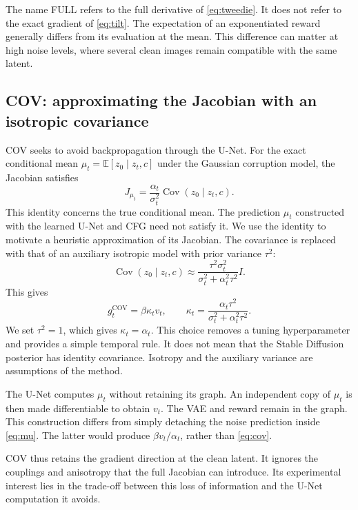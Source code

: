 \documentclass[11pt,a4paper]{article}
\newcommand{\E}{\mathbb{E}}
\newcommand{\Cov}{\operatorname{Cov}}
\begin{document}
The name FULL refers to the full derivative of \eqref{eq:tweedie}. It does not refer to the exact gradient of \eqref{eq:tilt}. The expectation of an exponentiated reward generally differs from its evaluation at the mean. This difference can matter at high noise levels, where several clean images remain compatible with the same latent.

\subsection{COV: approximating the Jacobian with an isotropic covariance}
COV seeks to avoid backpropagation through the U-Net. For the exact conditional mean $\mu_t=\E[z_0\mid z_t,c]$ under the Gaussian corruption model, the Jacobian satisfies
\begin{equation}\label{eq:covidentity}
J_{\mu_t}=\frac{\alpha_t}{\sigma_t^2}\Cov(z_0\mid z_t,c).
\end{equation}
This identity concerns the true conditional mean. The prediction $\mu_t$ constructed with the learned U-Net and CFG need not satisfy it. We use the identity to motivate a heuristic approximation of its Jacobian. The covariance is replaced with that of an auxiliary isotropic model with prior variance $\tau^2$:
\begin{equation}
\Cov(z_0\mid z_t,c)\approx
\frac{\tau^2\sigma_t^2}{\sigma_t^2+\alpha_t^2\tau^2}I.
\end{equation}
This gives
\begin{equation}\label{eq:cov}
g_t^{\mathrm{COV}}=\beta\kappa_tv_t,
\qquad \kappa_t=\frac{\alpha_t\tau^2}{\sigma_t^2+\alpha_t^2\tau^2}.
\end{equation}
We set $\tau^2=1$, which gives $\kappa_t=\alpha_t$. This choice removes a tuning hyperparameter and provides a simple temporal rule. It does not mean that the Stable Diffusion posterior has identity covariance. Isotropy and the auxiliary variance are assumptions of the method.

The U-Net computes $\mu_t$ without retaining its graph. An independent copy of $\mu_t$ is then made differentiable to obtain $v_t$. The VAE and reward remain in the graph. This construction differs from simply detaching the noise prediction inside \eqref{eq:mu}. The latter would produce $\beta v_t/\alpha_t$, rather than \eqref{eq:cov}.

COV thus retains the gradient direction at the clean latent. It ignores the couplings and anisotropy that the full Jacobian can introduce. Its experimental interest lies in the trade-off between this loss of information and the U-Net computation it avoids.
\end{document}
